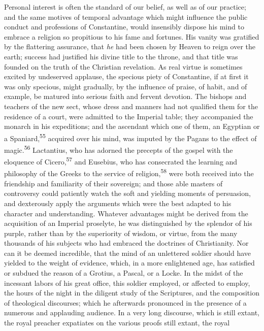 Personal interest is often the standard of our belief, as well as of
our practice; and the same motives of temporal advantage which might
influence the public conduct and professions of Constantine, would
insensibly dispose his mind to embrace a religion so propitious to his
fame and fortunes. His vanity was gratified by the flattering
assurance, that \textit{he} had been chosen by Heaven to reign over the earth;
success had justified his divine title to the throne, and that title
was founded on the truth of the Christian revelation. As real virtue is
sometimes excited by undeserved applause, the specious piety of
Constantine, if at first it was only specious, might gradually, by the
influence of praise, of habit, and of example, be matured into serious
faith and fervent devotion. The bishops and teachers of the new sect,
whose dress and manners had not qualified them for the residence of a
court, were admitted to the Imperial table; they accompanied the
monarch in his expeditions; and the ascendant which one of them, an
Egyptian or a Spaniard,\textsuperscript{55} acquired over his mind, was imputed by the
Pagans to the effect of magic.\textsuperscript{56} Lactantius, who has adorned the
precepts of the gospel with the eloquence of Cicero,\textsuperscript{57} and Eusebius,
who has consecrated the learning and philosophy of the Greeks to the
service of religion,\textsuperscript{58} were both received into the friendship and
familiarity of their sovereign; and those able masters of controversy
could patiently watch the soft and yielding moments of persuasion, and
dexterously apply the arguments which were the best adapted to his
character and understanding. Whatever advantages might be derived from
the acquisition of an Imperial proselyte, he was distinguished by the
splendor of his purple, rather than by the superiority of wisdom, or
virtue, from the many thousands of his subjects who had embraced the
doctrines of Christianity. Nor can it be deemed incredible, that the
mind of an unlettered soldier should have yielded to the weight of
evidence, which, in a more enlightened age, has satisfied or subdued
the reason of a Grotius, a Pascal, or a Locke. In the midst of the
incessant labors of his great office, this soldier employed, or
affected to employ, the hours of the night in the diligent study of the
Scriptures, and the composition of theological discourses; which he
afterwards pronounced in the presence of a numerous and applauding
audience. In a very long discourse, which is still extant, the royal
preacher expatiates on the various proofs still extant, the royal
